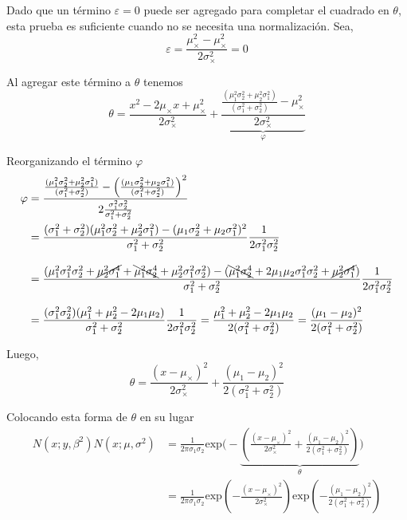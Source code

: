 \documentclass[a4paper,10pt]{article}
\begin{document}
Dado que un t\'ermino $\varepsilon = 0$ puede ser agregado para completar el cuadrado en $\theta$, esta prueba es suficiente cuando no se necesita una normalizaci\'on.
Sea, 
\begin{equation}
 \varepsilon = \frac{\mu_{\times}^2-\mu_{\times}^2}{2\sigma_{\times}^2} = 0
\end{equation}

Al agregar este t\'ermino a $\theta$ tenemos
\begin{equation}
 \theta = \frac{x^2 - 2\mu_{\times}x + \mu_{\times}^2 }{2\sigma_{\times}^2} + \underbrace{\frac{ \frac{(\mu_1^2\sigma_2^2 + \mu_2^2\sigma_1^2)}{(\sigma_1^2 + \sigma_2^2) } - \mu_{\times}^2}{2\sigma_{\times}^2}}_{\varphi}
\end{equation}

Reorganizando el t\'ermino $\varphi$
\begin{equation}
\begin{split}
\varphi & = \frac{\frac{(\mu_1^2\sigma_2^2 + \mu_2^2\sigma_1^2)}{(\sigma_1^2 + \sigma_2^2) } - \left(\frac{(\mu_1\sigma_2^2 + \mu_2\sigma_1^2)}{(\sigma_1^2 + \sigma_2^2) }\right)^2 }{2\frac{\sigma_1^2\sigma_2^2}{\sigma_1^2+\sigma_2^2}}  \\
& = \frac{(\sigma_1^2 + \sigma_2^2)(\mu_1^2\sigma_2^2 + \mu_2^2\sigma_1^2) - (\mu_1\sigma_2^2 + \mu_2\sigma_1^2)^2}{\sigma_1^2 + \sigma_2^2}\frac{1}{2\sigma_1^2\sigma_2^2} \\[0.3cm]
& = \frac{(\mu_1^2\sigma_1^2\sigma_2^2 + \cancel{\mu_2^2\sigma_1^4} + \bcancel{\mu_1^2\sigma_2^4} + \mu_2^2\sigma_1^2\sigma_2^2) - (\bcancel{\mu_1^2\sigma_2^4} + 2\mu_1\mu_2\sigma_1^2\sigma_2^2 + \cancel{\mu_2^2\sigma_1^4} )}{\sigma_1^2 + \sigma_2^2}  \frac{1}{2\sigma_1^2\sigma_2^2} \\[0.3cm] 
& = \frac{(\sigma_1^2\sigma_2^2)(\mu_1^2 + \mu_2^2 - 2\mu_1\mu_2)}{\sigma_1^2 + \sigma_2^2}\frac{1}{2\sigma_1^2\sigma_2^2} = \frac{\mu_1^2 + \mu_2^2 - 2\mu_1\mu_2}{2(\sigma_1^2 + \sigma_2^2)} = \frac{(\mu_1 - \mu_2)^2}{2(\sigma_1^2 + \sigma_2^2)}
\end{split}
\end{equation}

Luego,
\begin{equation}
 \theta = \frac{(x-\mu_{\times})^2}{2\sigma_{\times}^2} + \frac{(\mu_1 - \mu_2)^2}{2(\sigma_1^2 + \sigma_2^2)} 
\end{equation}

Colocando esta forma de $\theta$ en su lugar
\begin{equation}
\begin{split}
 N(x;y,\beta^2)N(x;\mu,\sigma^2) & = \frac{1}{2\pi\sigma_1\sigma_2}\text{exp}\Bigg(-\underbrace{\left( \frac{(x-\mu_{\times})^2}{2\sigma_{\times}^2} + \frac{(\mu_1 - \mu_2)^2}{2(\sigma_1^2 + \sigma_2^2)} \right)}_{\theta} \Bigg) \\
 & = \frac{1}{2\pi\sigma_1\sigma_2}\text{exp}\left(  - \frac{(x-\mu_{\times})^2}{2\sigma_{\times}^2} \right) \text{exp} \left( - \frac{(\mu_1 - \mu_2)^2}{2(\sigma_1^2 + \sigma_2^2)} \right) 
\end{split}
\end{equation}
\end{document}
